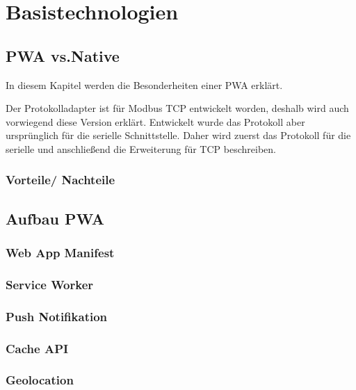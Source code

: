 \chapter{Basistechnologien}
\thispagestyle{standard}
\pagestyle{standard}
\renewcommand{\footrulewidth}{0.4pt}

\section{PWA vs.Native}

In diesem Kapitel werden die Besonderheiten einer PWA erklärt.

Der Protokolladapter ist für Modbus TCP entwickelt worden, deshalb wird auch vorwiegend diese Version erklärt. Entwickelt wurde das Protokoll aber ursprünglich für die serielle Schnittstelle. Daher wird zuerst das Protokoll für die serielle und anschließend die Erweiterung für TCP beschreiben.

\subsection{Vorteile/ Nachteile}


\section{Aufbau PWA}

\subsection{Web App Manifest}


\subsection{Service Worker}


\subsection{Push Notifikation}


\subsection{Cache API}

\subsection{Geolocation}



